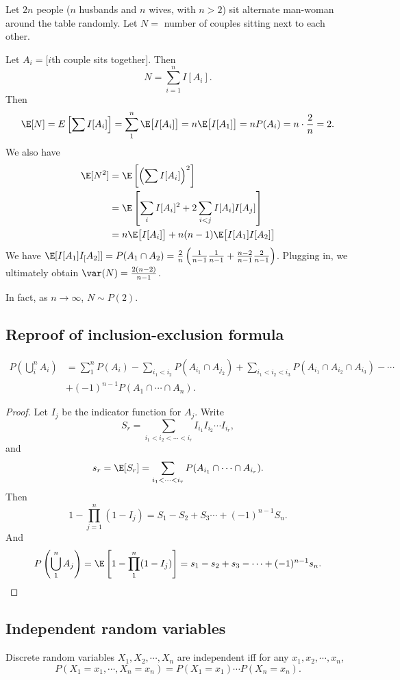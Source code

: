 \documentclass[a4paper]{article}
\begin{document}
\begin{eg}
  Let $2n$ people ($n$ husbands and $n$ wives, with $n > 2$) sit alternate man-woman around the table randomly. Let $N =$ number of couples sitting next to each other.

  Let $A_i = [i$th couple sits together$]$. Then
  \[
    N = \sum_{i = 1}^n I[A_i].
  \]
  Then 
  \[
    \E[N] = E\left[\sum I[A_i]\right] = \sum_{1}^n \E\big[I[A_i]\big] = n\E\big[I[A_1]\big] = nP(A_i) = n\cdot \frac{2}{n} = 2.
  \]
  We also have
  \begin{align*}
    \E[N^2] &= \E\left[\left(\sum I[A_i]\right)^2\right]\\
    &= \E\left[\sum_i I[A_i]^2 + 2\sum_{i < j}I[A_i]I[A_j]\right]\\
    &= n\E\big[I[A_i]\big] + n(n - 1)\E\big[I[A_1]I[A_2]\big]
  \end{align*}
  We have $\E[I[A_1]I_[A_2]] = P(A_1\cap A_2) = \frac{2}{n}\left(\frac{1}{n - 1}\frac{1}{n - 1}  + \frac{n - 2}{n - 1}\frac{2}{n - 1}\right)$. Plugging in, we ultimately obtain $\var(N) = \frac{2(n- 2)}{n - 1}$.

  In fact, as $n\to \infty$, $N\sim P(2)$.
\end{eg}

\subsection{Reproof of inclusion-exclusion formula}
\begin{thm}
  \begin{align*}
    P\left(\bigcup_i^n A_i\right) &= \sum_1^n P(A_i) - \sum_{i_1 < i_2} P(A_{i_1}\cap A_{j_2}) + \sum_{i_1 < i_2 < i_3}P(A_{i_1}\cap A_{i_2} \cap A_{i_3}) - \cdots\\
    &+ (-1)^{n - 1} P(A_1\cap \cdots \cap A_n).
  \end{align*}
\end{thm}

\begin{proof}
  Let $I_j$ be the indicator function for $A_j$. Write
  \[
    S_r = \sum_{i_1 < i_2 < \cdots < i_r}I_{i_1}I_{i_2}\cdots I_{i_r},
  \]
  and
  \[
    s_r = \E[S_r] = \sum_{i_1 < \cdots < i_r}P(A_{i_1}\cap \cdots \cap A_{i_r}).
  \]
  Then
  \[
    1 - \prod_{j = 1}^n(1 - I_j) = S_1 - S_2 + S_3 \cdots + (-1)^{n - 1}S_n.
  \]
  And 
  \[
    P\left(\bigcup_1^n A_j\right) = \E\left[1 - \prod_1^n(1 - I_j)\right] = s_1 - s_2 + s_3 - \cdots + (-1)^{n - 1}s_n.
  \]
\end{proof}
\subsection{Independent random variables}
\begin{defi}
  Discrete random variables $X_1, X_2, \cdots, X_n$ are independent iff for any $x_1, x_2, \cdots, x_n$,
  \[
    P(X_1 = x_1, \cdots, X_n = x_n) = P(X_1 = x_1)\cdots P(X_n = x_n).
  \]
\end{defi}
\end{document}
